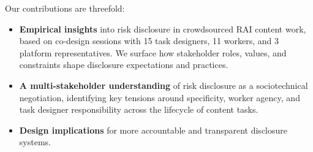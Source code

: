Our contributions are threefold:

\begin{itemize}
\item \textbf{Empirical insights} into risk disclosure in crowdsourced RAI content work, based on co-design sessions with 15 task designers, 11 workers, and 3 platform representatives. We surface how stakeholder roles, values, and constraints shape disclosure expectations and practices.
\item \textbf{A multi-stakeholder understanding} of risk disclosure as a sociotechnical negotiation, identifying key tensions around specificity, worker agency, and task designer responsibility across the lifecycle of content tasks.
\item \textbf{Design implications} for more accountable and transparent disclosure systems.

\end{itemize}
